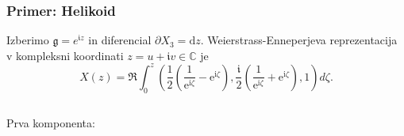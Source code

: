 \documentclass[8pt]{beamer}
\theoremstyle{definition}
\theoremstyle{remark}
\theoremstyle{plain}
\numberwithin{equation}{section}  %
\begin{document}
\begin{frame}
    \frametitle{Primer: Helikoid}

    Izberimo $\mathfrak{g} = e^{\mathfrak{i}z}$ in diferencial $\partial X_3 = \mathrm{d}z$. Weierstrass-Enneperjeva reprezentacija v kompleksni koordinati $z=u+\mathfrak{i} v \in \mathbb{C}$ je
    \begin{equation*}
        X(z)=\Re \int_0^z\left(\frac{1}{2}\left(\frac{1}{\mathrm{e}^{\mathrm{i} \zeta}}-\mathrm{e}^{\mathrm{i} \zeta}\right), \frac{\mathfrak{i}}{2}\left(\frac{1}{\mathrm{e}^{\mathrm{i} \zeta}}+\mathrm{e}^{\mathrm{i} \zeta}\right), 1\right) d \zeta .
    \end{equation*}
    \begin{columns}
        \begin{column}{0.475\textwidth}
            Prva komponenta:
        \end{column}


\end{columns}
\end{frame}
\end{document}

